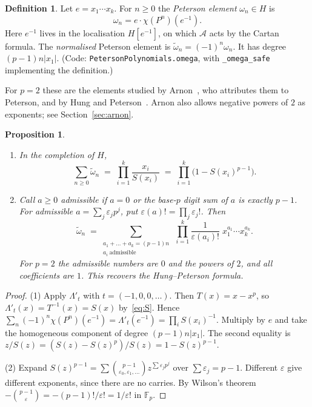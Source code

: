\documentclass[11pt]{amsart}
\newtheorem{proposition}[theorem]{Proposition}
\theoremstyle{definition}
\newtheorem{definition}[theorem]{Definition}
\theoremstyle{remark}
\newcommand{\F}{\mathbb{F}_p}
\newcommand{\A}{\mathcal{A}}
\newcommand{\wt}{\widetilde{\omega}}
\newcommand{\code}[1]{\texttt{#1}}
\begin{document}
\begin{definition}\label{def:peterson}
Let $e=x_1\cdots x_k$.  For $n\ge0$ the \emph{Peterson element}
$\omega_n\in H$ is
\[
  \omega_n=e\cdot\chi(P^n)(e^{-1}).
\]
Here $e^{-1}$ lives in the localisation $H[e^{-1}]$, on which $\A$ acts by the
Cartan formula.  The \emph{normalised} Peterson element is
$\wt_n=(-1)^n\omega_n$.  It has degree $(p-1)n|x_1|$.  (Code:
\code{PetersonPolynomials.omega}, with \code{\_omega\_safe} implementing the
definition.)
\end{definition}

For $p=2$ these are the elements studied by Arnon~\cite[Def.~3.2]{Arnon},
who attributes them to Peterson, and by Hung and
Peterson~\cite[\S2]{HungPeterson98}.  Arnon also allows negative powers of $2$
as exponents; see Section~\ref{sec:arnon}.

\begin{proposition}\label{prop:monomials}
\begin{enumerate}
\item In the completion of $H$,
\[
  \sum_{n\ge0}\wt_n\;=\;\prod_{i=1}^k\frac{x_i}{S(x_i)}\;=\;\prod_{i=1}^k\bigl(1-S(x_i)^{p-1}\bigr).
\]
\item Call $a\ge0$ \emph{admissible} if $a=0$ or the base-$p$ digit sum of $a$
is exactly $p-1$.  For admissible $a=\sum_j\varepsilon_jp^j$, put
$\varepsilon(a)!=\prod_j\varepsilon_j!$.  Then
\[
  \wt_n\;=\sum_{\substack{a_1+\dots+a_k=(p-1)n\\ a_i\ \text{admissible}}}
  \ \prod_{i=1}^k\frac{1}{\varepsilon(a_i)!}\;x_1^{a_1}\cdots x_k^{a_k}.
\]
For $p=2$ the admissible numbers are $0$ and the powers of $2$, and all
coefficients are $1$.  This recovers the Hung--Peterson formula.
\end{enumerate}
\end{proposition}

\begin{proof}
(1) Apply $\Lambda'_t$ with $t=(-1,0,0,\dots)$.  Then
$T(x)=x-x^p$, so $\Lambda'_t(x)=T^{-1}(x)=S(x)$ by~\eqref{eq:S}.  Hence
$\sum_n(-1)^n\chi(P^n)(e^{-1})=\Lambda'_t(e^{-1})=\prod_iS(x_i)^{-1}$.  Multiply
by $e$ and take the homogeneous component of degree $(p-1)n|x_1|$.  The second
equality is $z/S(z)=(S(z)-S(z)^p)/S(z)=1-S(z)^{p-1}$.

(2) Expand $S(z)^{p-1}=\sum\binom{p-1}{\varepsilon_0,\varepsilon_1,\dots}
z^{\sum\varepsilon_jp^j}$ over $\sum\varepsilon_j=p-1$.  Different
$\varepsilon$ give different exponents, since there are no carries.  By Wilson's
theorem $-\binom{p-1}{\varepsilon}=-(p-1)!/\varepsilon!=1/\varepsilon!$ in
$\F$.
\end{proof}
\end{document}
